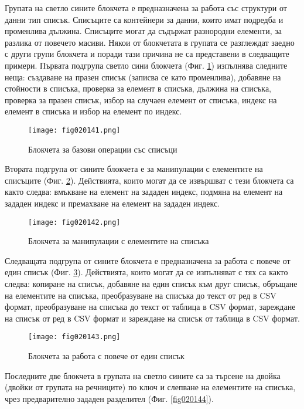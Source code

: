Групата на светло сините блокчета е предназначена за работа със структури от данни тип списък. Списъците са контейнери за данни, които имат подредба и променлива дължина. Списъците могат да съдържат разнородни елементи, за разлика от повечето масиви. Някои от блокчетата в групата се разглеждат заедно с други групи блокчета и поради тази причина не са представени в следващите примери. Първата подгрупа светло сини блокчета (Фиг. \ref{fig020141}) изпълнява следните неща: създаване на празен списък (записва се като променлива), добавяне на стойности в списъка, проверка за елемент в списъка, дължина на списъка, проверка за празен списък, избор на случаен елемент от списъка, индекс на елемент в списъка и избор на елемент по индекс.

\begin{figure}[H]
  \centering
  \texttt{[image: fig020141.png]}
  \caption{Блокчета за базови операции със списъци}
\label{fig020141}
\end{figure}

Втората подгрупа от сините блокчета е за манипулации с елементите на списъците (Фиг. \ref{fig020142}). Действията, които могат да се извършват с тези блокчета са както следва: вмъкване на елемент на зададен индекс, подмяна на елемент на зададен индекс и премахване на елемент на зададен индекс.

\begin{figure}[H]
  \centering
  \texttt{[image: fig020142.png]}
  \caption{Блокчета за манипулации с елементите на списъка}
\label{fig020142}
\end{figure}

Следващата подгрупа от сините блокчета е предназначена за работа с повече от един списък (Фиг. \ref{fig020143}). Действията, които могат да се изпълняват с тях са както следва: копиране на списък, добавяне на един списък към друг списък, обръщане на елементите на списъка, преобразуване на списъка до текст от ред в CSV формат, преобразуване на списъка до текст от таблица в CSV формат, зареждане на списък от ред в CSV формат и зареждане на списък от таблица в CSV формат.

\begin{figure}[H]
  \centering
  \texttt{[image: fig020143.png]}
  \caption{Блокчета за работа с повече от един списък}
\label{fig020143}
\end{figure}

Последните две блокчета в групата на светло сините са за търсене на двойка (двойки от групата на речниците) по ключ и слепване на елементите на списъка, чрез предварително зададен разделител (Фиг. \ref{fig020144}).

